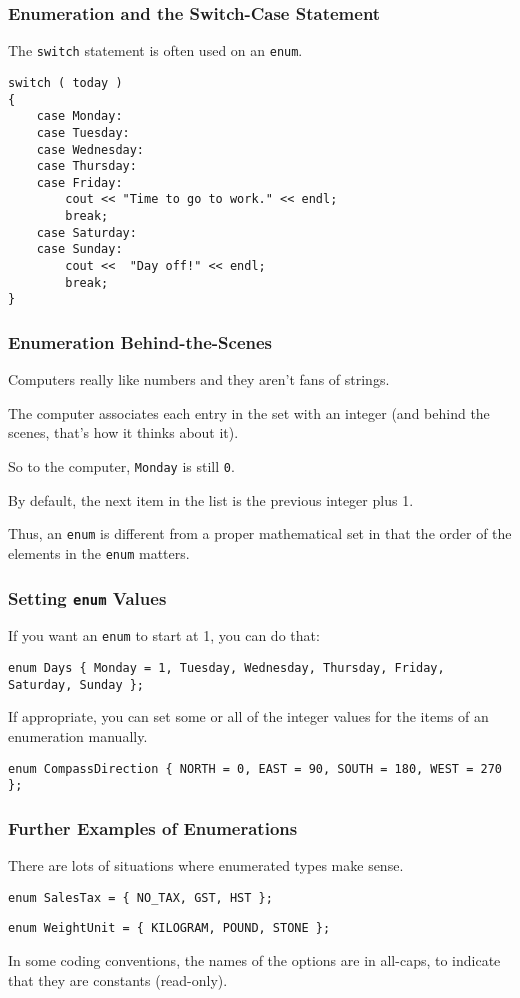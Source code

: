 \begin{frame}[fragile]
\frametitle{Enumeration and the Switch-Case Statement}
The \texttt{switch} statement is often used on an \texttt{enum}.

\begin{verbatim}
switch ( today )
{
    case Monday:
    case Tuesday:
    case Wednesday:
    case Thursday:
    case Friday:
        cout << "Time to go to work." << endl;
        break;
    case Saturday:
    case Sunday:
        cout <<  "Day off!" << endl;
        break;
}
\end{verbatim}

\end{frame}

\begin{frame}
\frametitle{Enumeration Behind-the-Scenes}
Computers really like numbers and they aren't fans of strings.

The computer associates each entry in the set with an integer (and behind the scenes, that's how it thinks about it).

So to the computer, \texttt{Monday} is still \texttt{0}.

By default, the next item in the list is the previous integer plus 1.

Thus, an \texttt{enum} is different from a proper mathematical set in that the order of the elements in the \texttt{enum} matters.

\end{frame}

\begin{frame}
\frametitle{Setting \texttt{enum} Values}

If you want an \texttt{enum} to start at 1, you can do that:

\texttt{enum Days \{ Monday = 1, Tuesday, Wednesday, Thursday, Friday, Saturday, Sunday \};}

If appropriate, you can set some or all of the integer values for the items of an enumeration manually.

\texttt{enum CompassDirection \{ NORTH = 0, EAST = 90, SOUTH = 180, WEST = 270 \};}

\end{frame}

\begin{frame}
\frametitle{Further Examples of Enumerations}
There are lots of situations where enumerated types make sense.

\texttt{enum SalesTax = \{ NO\_TAX, GST, HST \}; }

\texttt{enum WeightUnit = \{ KILOGRAM, POUND, STONE \};}

In some coding conventions, the names of the options are in all-caps, to indicate that they are constants (read-only).

\end{frame}

